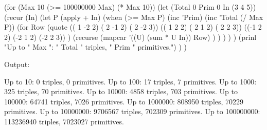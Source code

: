 \begin{wideverbatim}

(for (Max 10  (>= 100000000 Max)  (* Max 10))
   (let (Total 0  Prim 0  In (3 4 5))
      (recur (In)
         (let P (apply + In)
            (when (>= Max P)
               (inc 'Prim)
               (inc 'Total (/ Max P))
               (for Row
                  (quote
                     (( 1 -2 2) ( 2 -1 2) ( 2 -2 3))
                     (( 1  2 2) ( 2  1 2) ( 2  2 3))
                     ((-1  2 2) (-2  1 2) (-2  2 3)) )
                  (recurse
                     (mapcar '((U) (sum * U In)) Row) ) ) ) ) )
      (prinl "Up to " Max ": " Total " triples, " Prim " primitives.") ) )

Output:

Up to 10: 0 triples, 0 primitives.
Up to 100: 17 triples, 7 primitives.
Up to 1000: 325 triples, 70 primitives.
Up to 10000: 4858 triples, 703 primitives.
Up to 100000: 64741 triples, 7026 primitives.
Up to 1000000: 808950 triples, 70229 primitives.
Up to 10000000: 9706567 triples, 702309 primitives.
Up to 100000000: 113236940 triples, 7023027 primitives.

\end{wideverbatim}



% 
